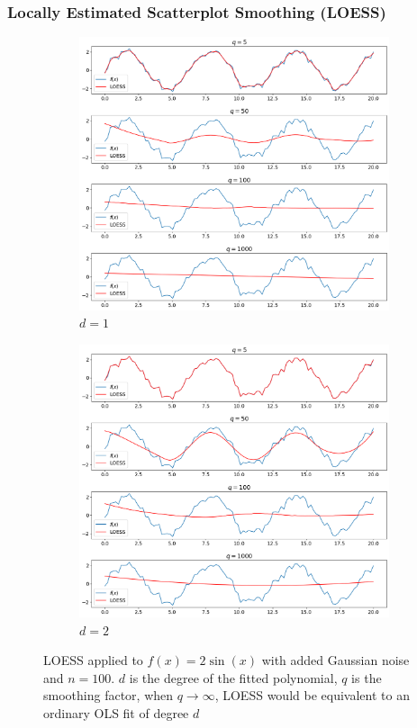 \documentclass[presentation.tex]{subfiles}
\begin{document}
\begin{frame}
\frametitle{Locally Estimated Scatterplot Smoothing (LOESS)}
  \begin{figure}
    \centering
    \begin{subfigure}[b]{0.49\textwidth}
      \centering
      \includegraphics[width=\textwidth]{imgs/loess1}
      \caption{$d=1$}
  \end{subfigure}
  \begin{subfigure}[b]{0.49\textwidth}
    \centering
    \includegraphics[width=\textwidth]{imgs/loess2}
    \caption{$d=2$}
  \end{subfigure}
  \caption{LOESS applied to $f(x) = 2\sin(x)$ with added Gaussian noise and $n =
    100$. $d$ is the degree of the fitted polynomial, $q$ is the smoothing factor, when
    $q \rightarrow \infty$, LOESS would be equivalent to an ordinary OLS fit of degree $d$}
\end{figure}
\end{frame}
\end{document}

